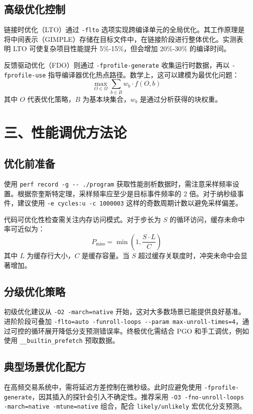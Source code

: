 \section{高级优化控制}
链接时优化（LTO）通过 \verb!-flto! 选项实现跨编译单元的全局优化。其工作原理是将中间表示（GIMPLE）存储在目标文件中，在链接阶段进行整体优化。实测表明 LTO 可使复杂项目性能提升 5\%{}-15\%{}，但会增加 20\%{}-30\%{} 的编译时间。\par
反馈驱动优化（FDO）则通过 \verb!-fprofile-generate! 收集运行时数据，再以 \verb!-fprofile-use! 指导编译器优化热点路径。数学上，这可以建模为最优化问题：
$$ \max_{O \in \Omega} \sum_{b \in B} w_b \cdot f(O,b) $$
其中 $O$ 代表优化策略，$B$ 为基本块集合，$w_b$ 是通过分析获得的块权重。\par
\chapter{三、性能调优方法论}
\section{优化前准备}
使用 \verb!perf record -g -- ./program! 获取性能剖析数据时，需注意采样频率设置。根据奈奎斯特定理，采样频率应至少是目标事件频率的 2 倍。对于纳秒级事件，建议使用 \verb!-e cycles:u -c 1000003! 这样的奇数周期计数以避免采样偏差。\par
代码可优化性检查需关注内存访问模式。对于步长为 $S$ 的循环访问，缓存未命中率可近似为：
$$ P_{\text{miss}} = \min\left(1, \frac{S \cdot L}{C}\right) $$
其中 $L$ 为缓存行大小，$C$ 是缓存容量。当 $S$ 超过缓存关联度时，冲突未命中会显著增加。\par
\section{分级优化策略}
初级优化建议从 \verb!-O2 -march=native! 开始，这对大多数场景已能提供良好基准。进阶阶段可叠加 \verb!-flto=auto -funroll-loops --param max-unroll-times=4!，通过可控的循环展开降低分支预测错误率。终极优化需结合 PGO 和手工调优，例如使用 \verb!__builtin_prefetch! 预取数据。\par
\section{典型场景优化配方}
在高频交易系统中，需将延迟方差控制在微秒级。此时应避免使用 \verb!-fprofile-generate!，因其插入的探针会引入不确定性。推荐采用 \verb!-O3 -fno-unroll-loops -march=native -mtune=native! 组合，配合 \verb!likely/unlikely! 宏优化分支预测。\par
